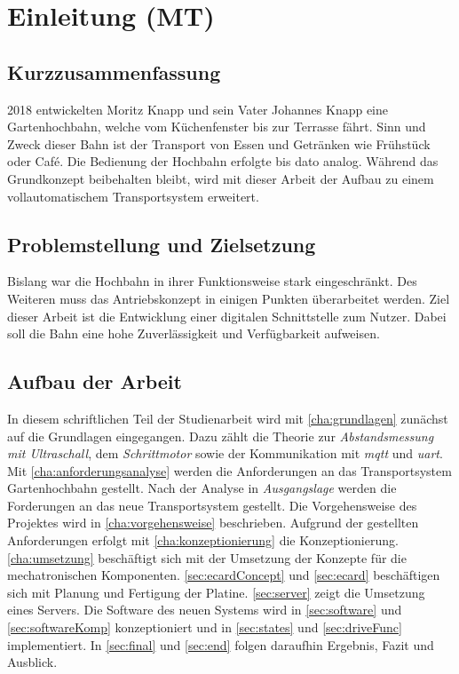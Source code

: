 
\chapter{Einleitung (MT)}

\section{Kurzzusammenfassung}
2018 entwickelten Moritz Knapp und sein Vater Johannes Knapp eine Gartenhochbahn, welche vom Küchenfenster bis zur Terrasse fährt. 
Sinn und Zweck dieser Bahn ist der Transport von Essen und Getränken wie Frühstück oder Café. Die Bedienung der Hochbahn erfolgte bis dato analog. Während das Grundkonzept beibehalten bleibt, wird mit dieser Arbeit der Aufbau zu einem vollautomatischem Transportsystem erweitert.

\section{Problemstellung und Zielsetzung}
    
Bislang war die Hochbahn in ihrer Funktionsweise stark eingeschränkt. Des Weiteren muss das Antriebskonzept in einigen Punkten überarbeitet werden. Ziel dieser Arbeit ist die Entwicklung einer digitalen Schnittstelle zum Nutzer. Dabei soll die Bahn eine hohe Zuverlässigkeit und Verfügbarkeit aufweisen. 
\newpage

\section{Aufbau der Arbeit}
In diesem schriftlichen Teil der Studienarbeit wird mit \autoref{cha:grundlagen} zunächst auf die Grundlagen eingegangen. Dazu zählt die Theorie zur \textit{Abstandsmessung mit Ultraschall}, dem \textit{Schrittmotor} sowie der Kommunikation mit \textit{\acrshort{mqtt}} und \textit{\acrshort{uart}}. 
Mit \autoref{cha:anforderungsanalyse} werden die Anforderungen an das Transportsystem Gartenhochbahn gestellt. Nach der Analyse in \textit{Ausgangslage} werden die Forderungen an das neue Transportsystem gestellt. Die Vorgehensweise des Projektes wird in \autoref{cha:vorgehensweise} beschrieben. Aufgrund der gestellten Anforderungen erfolgt mit \autoref{cha:konzeptionierung} die Konzeptionierung. \autoref{cha:umsetzung} beschäftigt sich mit der Umsetzung der Konzepte für die mechatronischen Komponenten. \autoref{sec:ecardConcept} und \autoref{sec:ecard} beschäftigen sich mit Planung und Fertigung der Platine. \autoref{sec:server} zeigt die Umsetzung eines Servers. Die Software des neuen Systems wird in \autoref{sec:software} und \autoref{sec:softwareKomp} konzeptioniert und in \autoref{sec:states} und \autoref{sec:driveFunc} implementiert. In \autoref{sec:final} und \autoref{sec:end} folgen daraufhin Ergebnis, Fazit und Ausblick.
 




